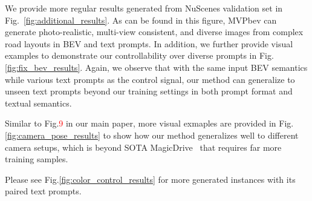 \documentclass[sigconf]{acmart}
\begin{document}
 We provide more regular results generated from NuScenes validation set in Fig.~\ref{fig:additional_results}. As can be found in this figure, MVPbev can generate photo-realistic, multi-view consistent, and diverse images from complex road layouts in BEV and text prompts. In addition, we further provide visual examples to demonstrate our controllability over diverse prompts in Fig.\ref{fig:fix_bev_results}. Again, we observe that with the same input BEV semantics while various text prompts as the control signal, our method can generalize to unseen text prompts beyond our training settings in both prompt format and textual semantics.



 Similar to Fig.\textcolor{red}{9} in our main paper, more visual exmaples are provided in Fig.\ref{fig:camera_pose_results} to show how our method generalizes well to different camera setups, which is beyond SOTA MagicDrive~\cite{gao2023magicdrive} that requires far more training samples.

 Please see Fig.\ref{fig:color_control_results} for more generated instances with its paired text prompts.

\end{document}
